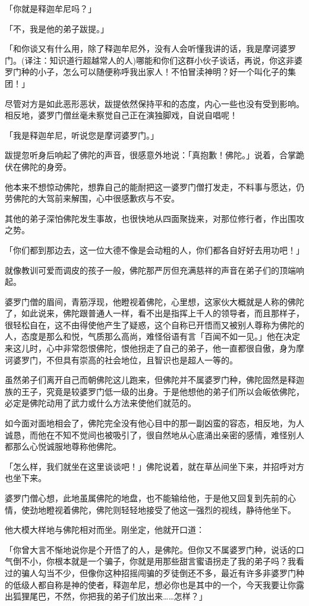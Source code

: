 \documentclass[twoside,openany]{book}
\begin{document}
「你就是释迦牟尼吗？」

「不，我是他的弟子跋提。」

「和你谈又有什么用，除了释迦牟尼外，没有人会听懂我讲的话，我是摩诃婆罗门。(译注：知识道行超越常人的人)哪能和你们这群小伙子谈话，再说，你这非婆罗门种的小子，怎么可以随便称呼我出家人！不怕冒渎神明？好一个叫化子的集团！」

尽管对方是如此恶形恶状，跋提依然保持平和的态度，内心一些也没有受到影响。相反地，婆罗门僧丝毫未察觉自己正在演独脚戏，自说自唱呢！

「我是释迦牟尼，听说您是摩诃婆罗门。」

跋提忽听身后响起了佛陀的声音，很感意外地说：「真抱歉！佛陀。」说着，合掌跪伏在佛陀的身旁。

他本来不想惊动佛陀，想靠自己的能耐把这一婆罗门僧打发走，不料事与愿达，仍劳佛陀的大驾前来解围，心中很感歉疚与不安。

其他的弟子深怕佛陀发生事故，也很快地从四面聚拢来，对那位修行者，作出围攻之势。

「你们都到那边去，这一位大德不像是会动粗的人，你们都各自好好去用功吧！」

就像教训可爱而调皮的孩子一般，佛陀那严厉但充满慈祥的声音在弟子们的顶端响起。

婆罗门僧的眉间，青筋浮现，他瞪视着佛陀，心里想，这家伙大概就是人称的佛陀了，如此说来，佛陀跟普通人一样，看不出是指挥上千人的领导者，而且那样子，很轻松自在，这不由得使他产生了疑惑，这个自称已开悟而又被别人尊称为佛陀的人，态度是那么和悦，气质那么高尚，难怪俗语有言「百闻不如一见。」他在决定来这儿时，心中非常怨恨佛陀，恨他拐走了自己的弟子，他一直都很自傲，身为摩诃婆罗门，不但具有崇高的社会地位，且智识也是超人一等的。

虽然弟子们离开自己而朝佛陀这儿跑来，但佛陀并不属婆罗门种，佛陀固然是释迦族的王子，究竟是较婆罗门低一级的出身。于是他想他的弟子们所以会皈依佛陀，必定是佛陀动用了武力或什么方法来使他们就范的。

如今面对面地相会了，佛陀完全没有他心目中的那一副凶蛮的容态，相反地，为人诚恳，而他在不知不觉间也被吸引了，很自然地从心底涌出亲密的感情，难怪别人都那么心悦诚服地尊称他佛陀。

「怎么样，我们就坐在这里谈谈吧！」佛陀说着，就在草丛间坐下来，并招呼对方也坐下来。

婆罗门僧心想，此地虽属佛陀的地盘，也不能输给他，于是他又回复到先前的心情，使劲地瞪视着佛陀，佛陀则轻轻地接受了他这一强烈的视线，静待他坐下。

他大模大样地与佛陀相对而坐。刚坐定，他就开口道：

「你曾大言不惭地说你是个开悟了的人，是佛陀。但你又不属婆罗门种，说话的口气倒不小，你根本就是一个骗子，你就是用那些甜言蜜语拐走了我的弟子吗？我看过的骗人勾当不少，但像你这种招摇闯骗的歹徒倒还不多，最近有许多非婆罗门种的低级人都自称是神的使者，释迦牟尼，想必你也是其中的一个，今天我要让你露出狐狸尾巴，不然，你把我的弟子们放出来……怎样？」
\end{document}
